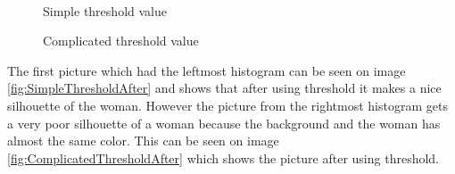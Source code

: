 \begin{figure}[htbp]
\begin{minipage}[b]{0.45\textwidth}
\end{minipage} \\ %
\begin{minipage}[t]{0.45\textwidth}
\caption{Simple threshold value} %
\label{fig:SimpleThreshold}
\end{minipage} \hfill
\begin{minipage}[t]{0.45\textwidth}
\caption{Complicated threshold value} %
\label{fig:ComplicatedThreshold}
\end{minipage}
\end{figure}

The first picture which had the leftmost histogram can be seen on image \eqref{fig:SimpleThresholdAfter} and shows that after using threshold it makes a nice silhouette of the woman. However the picture from the rightmost histogram gets a very poor silhouette of a woman because the background and the woman has almost the same color. This can be seen on image \eqref{fig:ComplicatedThresholdAfter} which shows the picture after using threshold.

